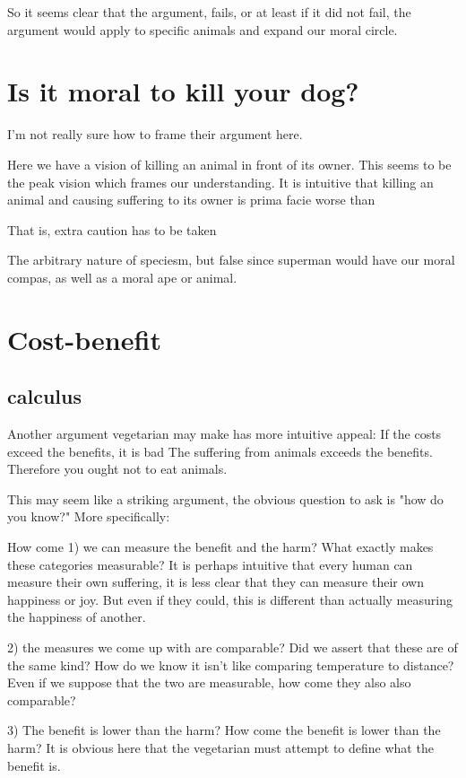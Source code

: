 So it seems clear that the argument, fails, or at least if it did not fail, the argument would apply to specific animals and expand our moral circle. 

\section{Is it moral to kill your dog?}

I'm not really sure how to frame their argument here. 


Here we have a vision of killing an animal in front of its owner. This seems to be the peak vision which frames our understanding. It is intuitive that killing an animal and causing suffering to its owner is prima facie worse than 


That is, extra caution has to be taken

The arbitrary nature of speciesm, but false since superman would have our moral compas, as well as a moral ape or animal. 

\section{Cost-benefit}

\subsection{calculus}

Another argument vegetarian may make has more intuitive appeal:
If the costs exceed the benefits, it is bad
The suffering from animals exceeds the benefits.
Therefore you ought not to eat animals. 

This may seem like a striking argument, the obvious question to ask is "how do you know?" More specifically:

How come 1) we can measure the benefit and the harm? What exactly makes these categories measurable? It is perhaps intuitive that every human can measure their own suffering, it is less clear that they can measure their own happiness or joy. But even if they could, this is different than actually measuring the happiness of another. 

2) the measures we come up with are comparable? Did we assert that these are of the same kind? How do we know it isn't like comparing temperature to distance? Even if we suppose that the two are measurable, how come they also also comparable?  

3) The benefit is lower than the harm? How come the benefit is lower than the harm? It is obvious here that the vegetarian must attempt to define what the benefit is. 

